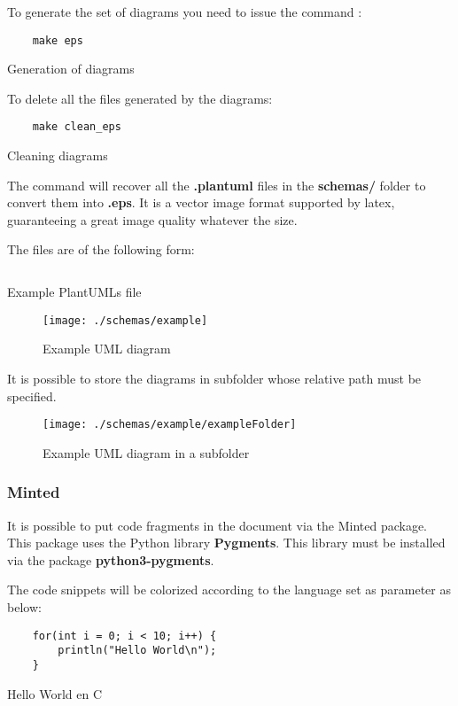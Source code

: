 To generate the set of diagrams you need to issue the command :
\begin{code}
    \begin{verbatim}
    make eps
\end{verbatim}
    \caption{Generation of diagrams}
\end{code}

To delete all the files generated by the diagrams:
\begin{code}
    \begin{verbatim}
    make clean_eps
\end{verbatim}
    \caption{Cleaning diagrams}
\end{code}

The command will recover all the \textbf{.plantuml} files
in the \textbf{schemas/} folder to convert them into \textbf{.eps}.
It is a vector image format supported by \gls{latex},
guaranteeing a great image quality whatever the size.

The files are of the following form:
\begin{code}
    \inputminted{vim}{schemas/example.plantuml}
    \caption{Example PlantUMLs file}
\end{code}

\begin{figure}[H]
    \centering
    \texttt{[image: ./schemas/example]}
    \caption{Example UML diagram}
\end{figure}

It is possible to store the diagrams in subfolder whose relative path must be specified.
\begin{figure}[H]
    \centering
    \texttt{[image: ./schemas/example/exampleFolder]}
    \caption{Example UML diagram in a subfolder}
\end{figure}

\subsubsection{Minted}
It is possible to put code fragments in the document via the Minted package.
This package uses the Python library \textbf{Pygments}.
This library must be installed via the package \textbf{python3-pygments}.

The code snippets will be colorized according to the language set as parameter as below:

\begin{code}
    \begin{verbatim}
    for(int i = 0; i < 10; i++) {
        println("Hello World\n");
    }
\end{verbatim}
    \caption{Hello World en C}
\end{code}

